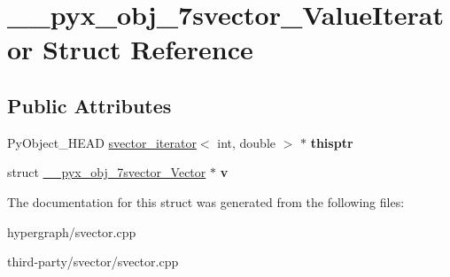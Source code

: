 \hypertarget{struct____pyx__obj__7svector__ValueIterator}{
\section{\_\-\_\-pyx\_\-obj\_\-7svector\_\-ValueIterator Struct Reference}
\label{struct____pyx__obj__7svector__ValueIterator}
}
\subsection*{Public Attributes}
\begin{DoxyCompactItemize}
\item 
\hypertarget{struct____pyx__obj__7svector__ValueIterator_a84c4b6a57426d1026bc9fee500e1f0bc}{
PyObject\_\-HEAD \hyperlink{structsvector__iterator}{svector\_\-iterator}$<$ int, double $>$ $\ast$ {\bfseries thisptr}}
\label{struct____pyx__obj__7svector__ValueIterator_a84c4b6a57426d1026bc9fee500e1f0bc}

\item 
\hypertarget{struct____pyx__obj__7svector__ValueIterator_ade8a9afa5e7ac991c03aa06401601931}{
struct \hyperlink{struct____pyx__obj__7svector__Vector}{\_\-\_\-pyx\_\-obj\_\-7svector\_\-Vector} $\ast$ {\bfseries v}}
\label{struct____pyx__obj__7svector__ValueIterator_ade8a9afa5e7ac991c03aa06401601931}

\end{DoxyCompactItemize}


The documentation for this struct was generated from the following files:\begin{DoxyCompactItemize}
\item 
hypergraph/svector.cpp\item 
third-\/party/svector/svector.cpp\end{DoxyCompactItemize}
